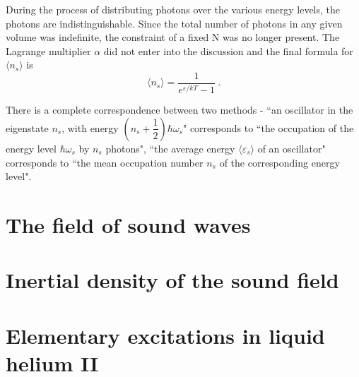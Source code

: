 \documentclass[12pt,a4paper]{article}
\begin{document}
During the process of distributing photons over the various energy levels, the photons are indistinguishable. Since the total number of photons in any given volume was indefinite, the constraint of a fixed N was no longer present. The Lagrange multiplier $\alpha$ did not enter into the discussion and the final formula for $\langle n_s \rangle$ is
\begin{equation}
\langle n_s \rangle = \frac{1}{e^{\varepsilon/kT} -1} ~.
\end{equation}

There is a complete correspondence between two methods - ``an oscillator in the eigenstate $n_s$, with energy $\left(n_s + \dfrac{1}{2}\right)\hbar \omega_s$" corresponds to ``the occupation of the energy level $\hbar \omega_s$ by $n_s$ photons", ``the average energy $\langle \varepsilon_s \rangle$ of an oscillator" corresponds to ``the mean occupation number $n_s$ of the corresponding energy level".


\section{The field of sound waves}


\section{Inertial density of the sound field}

\section{Elementary excitations in liquid helium II}
\end{document}
